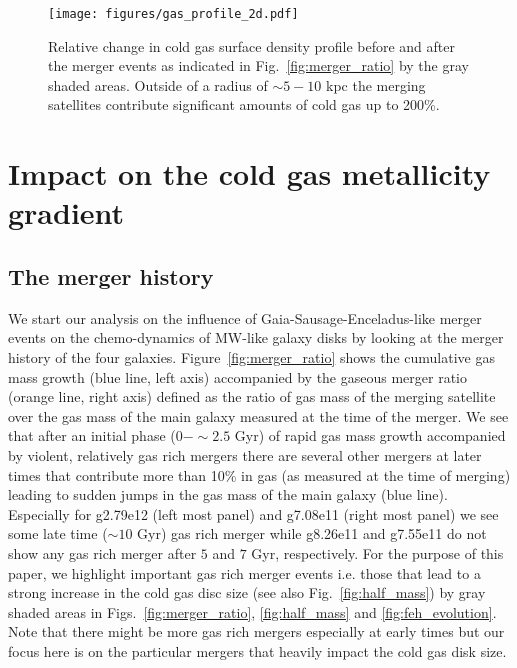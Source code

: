 \documentclass[useAMS,usenatbib]{mnras}
\begin{document}
\begin{figure}
    \begin{centering}
        \texttt{[image: figures/gas\_profile\_2d.pdf]}
        \vspace*{-1.75em}
        \caption{
            Relative change in cold gas surface density profile before and after the merger events as indicated in Fig.~\ref{fig:merger_ratio} by the gray shaded areas. Outside of a radius of $\sim5-10$ kpc the merging satellites contribute significant amounts of cold gas up to 200\%.
        }
        \label{fig:surf_den}
    \end{centering}
\end{figure}

\section{Impact on the cold gas metallicity gradient} \label{sec:results-gradient}

\subsection{The merger history} \label{sec:mergerhist}

We start our analysis on the influence of Gaia-Sausage-Enceladus-like merger
events on the chemo-dynamics of MW-like galaxy disks by looking at the merger history of the four galaxies. Figure~\ref{fig:merger_ratio} shows the cumulative gas mass growth (blue line, left axis) accompanied by the gaseous merger ratio (orange line, right axis) defined as the ratio of gas mass of the merging satellite over the gas mass of the main galaxy measured at the time of the merger. We see that after an initial phase ($0-\sim2.5$ Gyr) of rapid gas mass growth accompanied by violent, relatively gas rich mergers there are several other mergers at later times that contribute more than 10\% in gas (as measured at the time of merging) leading to sudden jumps in the gas mass of the main galaxy (blue line). 
Especially for g2.79e12 (left most panel) and g7.08e11 (right most panel) we see some late time ($\sim10$ Gyr) gas rich merger while g8.26e11 and g7.55e11 do not show any gas rich merger after $5$ and $7$ Gyr, respectively. For the purpose of this paper, we highlight important gas rich merger events i.e. those that lead to a strong increase in the cold gas disc size (see also Fig.~\ref{fig:half_mass}) by gray shaded areas in Figs.~\ref{fig:merger_ratio}, \ref{fig:half_mass} and \ref{fig:feh_evolution}. Note that there might be more gas rich mergers especially at early times but our focus here is on the particular mergers that heavily impact the cold gas disk size.
\end{document}
